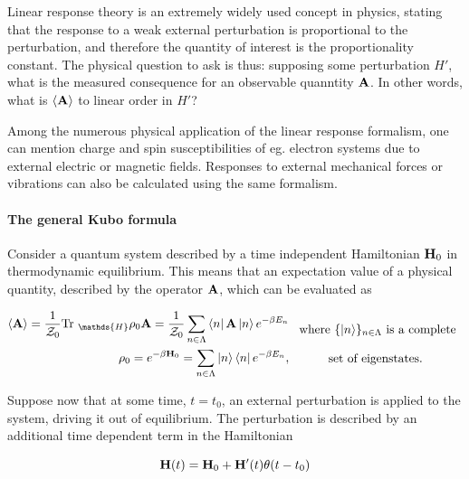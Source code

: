 \documentclass{homework}
\begin{document}
Linear response theory is an extremely widely used concept in physics, stating that the response to a weak external perturbation is proportional to the perturbation, and therefore the quantity of interest is the proportionality constant. The physical question to ask is thus: supposing some perturbation $H'$, what is the measured consequence for an observable quanntity ${\bf A}$. In other words, what is $\langle {\bf A} \rangle$ to linear order in $H'$? 

Among the numerous physical application of the linear response formalism, one can mention charge and spin susceptibilities of eg. electron systems due to external electric or magnetic fields. Responses to external mechanical forces or vibrations can also be calculated using the same formalism. \\

\paragraph{\textbf{The general Kubo formula}}

Consider a quantum system described by a time independent Hamiltonian ${\bf H}_0$ in thermodynamic equilibrium. This means that an expectation value of a physical quantity, described by the operator ${\bf A}$, which can be evaluated as 

\begin{equation}
    \begin{split}
        \langle {\bf A} \rangle = \frac{1}{\mathcal{Z}_0} \textnormal{Tr }_{\mathds{H}} \rho_0 {\bf A}  = \frac{1}{\mathcal{Z}_0} \sum_{n \in \Lambda} \bra{n} {{\bf A}} \ket{n} e^{-\beta E_n} \\
        \rho_0 = e^{-\beta {\bf H}_0} = \sum_{n \in \Lambda} \ket{n} \bra{n} e^{-\beta E_n},
    \end{split} \begin{array}{c}
         \textnormal{ where $\{\ket{n}\}_{n \in \Lambda}$ is a complete} \\
         \\
         \textnormal{set of eigenstates}.
    \end{array}
\end{equation}

Suppose now that at some time, $t = t_0$, an external perturbation is applied to the system, driving it out of equilibrium. The perturbation is described by an additional time dependent term in the Hamiltonian 

\begin{equation}
    {\bf H}(t) = {\bf H}_0 + {\bf H}'(t) \theta(t-t_0)
\end{equation}
\end{document}

